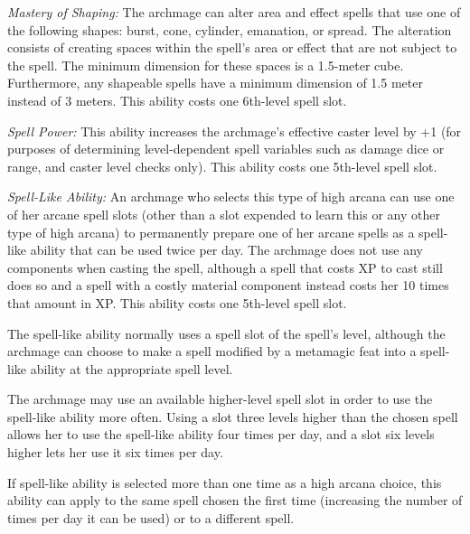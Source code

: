 {\textit{Mastery of Shaping:} The archmage can alter area and effect spells that use one of the following shapes: burst, cone, cylinder, emanation, or spread. The alteration consists of creating spaces within the spell's area or effect that are not subject to the spell. The minimum dimension for these spaces is a 1.5-meter cube. Furthermore, any shapeable spells have a minimum dimension of 1.5 meter instead of 3 meters. This ability costs one 6th-level spell slot.

\textit{Spell Power:} This ability increases the archmage's effective caster level by +1 (for purposes of determining level-dependent spell variables such as damage dice or range, and caster level checks only). This ability costs one 5th-level spell slot.

\textit{Spell-Like Ability:} An archmage who selects this type of high arcana can use one of her arcane spell slots (other than a slot expended to learn this or any other type of high arcana) to permanently prepare one of her arcane spells as a spell-like ability that can be used twice per day. The archmage does not use any components when casting the spell, although a spell that costs XP to cast still does so and a spell with a costly material component instead costs her 10 times that amount in XP. This ability costs one 5th-level spell slot.

The spell-like ability normally uses a spell slot of the spell's level, although the archmage can choose to make a spell modified by a metamagic feat into a spell-like ability at the appropriate spell level.

The archmage may use an available higher-level spell slot in order to use the spell-like ability more often. Using a slot three levels higher than the chosen spell allows her to use the spell-like ability four times per day, and a slot six levels higher lets her use it six times per day.

If spell-like ability is selected more than one time as a high arcana choice, this ability can apply to the same spell chosen the first time (increasing the number of times per day it can be used) or to a different spell.
}

